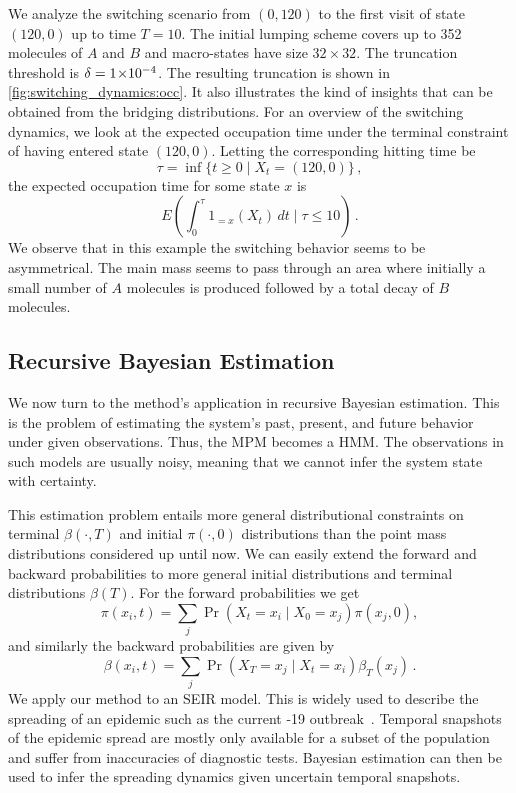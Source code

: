 We analyze the switching scenario from $(0, 120)$ to the first visit
of state $(120, 0)$ up to time $T=10$. The initial lumping scheme
covers up to \num{352} molecules of $A$ and $B$ and  macro-states
have size $32\times32$.
The truncation threshold is $\delta= 1\!\times\hspace{-.5ex} 10^{-4} $.
The resulting truncation is shown in \autoref{fig:switching_dynamics:occ}.
It also illustrates the kind of insights that can be obtained from
the bridging distributions.
For an overview of the switching dynamics, we look at the expected
occupation time under the terminal constraint of having entered state
$(120,0)$. Letting the corresponding hitting time be
\[
  \tau=\inf\{t\geq 0\mid X_t=(120, 0)\}\,,
\]
the expected occupation time for some state $x$ is
\[
  E\left(\int_0^{\tau}1_{=x}(X_t)\,dt\mid \tau\leq 10\right)\,.
\]
We observe that in this example the switching  behavior seems to be
asymmetrical.
The main mass seems to pass through an area where initially a small
number of $A$ molecules is produced followed by a total decay of $B$ molecules.

\subsection{Recursive Bayesian Estimation}
We now turn to the method's application in recursive Bayesian estimation.
This is the problem of estimating the system's
past, present, and future behavior under given observations.
Thus, the \ac{MPM} becomes a \acf{HMM}.
The observations in such models are usually noisy, meaning that we
cannot infer the system state with certainty.

This estimation problem entails more general distributional
constraints on terminal $\beta(\cdot,T)$ and initial $\pi(\cdot, 0)$
distributions than the point mass distributions considered up until now.
We can easily extend the forward and backward probabilities to more
general initial
distributions   and terminal distributions $\beta(T)$.
For the forward probabilities we get
\begin{equation}
  \pi(x_i, t) = \sum_j \Pr(X_t=x_i\mid X_0=x_j) \pi(x_j,0),
\end{equation}
and similarly the backward probabilities are given by
\begin{equation}
  \beta(x_i, t) = \sum_j\Pr(X_T=x_j\mid X_t = x_i) \beta_T(x_j)\,.
\end{equation}
We apply our method to an \acf{SEIR} model.
This is widely used to describe the spreading of an epidemic such as the current
-19 outbreak~\parencite{he2020seir,grossmann2020importance}.
Temporal snapshots of the epidemic spread  are mostly only available
for a subset of the population and suffer from   inaccuracies of
diagnostic tests.
Bayesian estimation can then be used to infer the spreading dynamics
given uncertain temporal snapshots.

